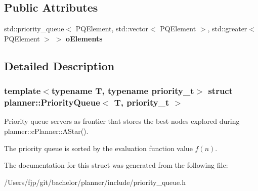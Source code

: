 \subsection*{Public Attributes}
\begin{DoxyCompactItemize}
\item 
\mbox{\label{structplanner_1_1_priority_queue_ac8dd7ed5a5d4b65eed6ccbe2b503dd3b}} 
std\+::priority\+\_\+queue$<$ P\+Q\+Element, std\+::vector$<$ P\+Q\+Element $>$, std\+::greater$<$ P\+Q\+Element $>$ $>$ {\bfseries o\+Elements}
\end{DoxyCompactItemize}


\subsection{Detailed Description}
\subsubsection*{template$<$typename T, typename priority\+\_\+t$>$\newline
struct planner\+::\+Priority\+Queue$<$ T, priority\+\_\+t $>$}

Priority queue servers as frontier that stores the best nodes explored during planner\+::c\+Planner\+::\+A\+Star(). 

The priority queue is sorted by the evaluation function value $f(n)$. 

The documentation for this struct was generated from the following file\+:\begin{DoxyCompactItemize}
\item 
/\+Users/fjp/git/bachelor/planner/include/priority\+\_\+queue.\+h\end{DoxyCompactItemize}
